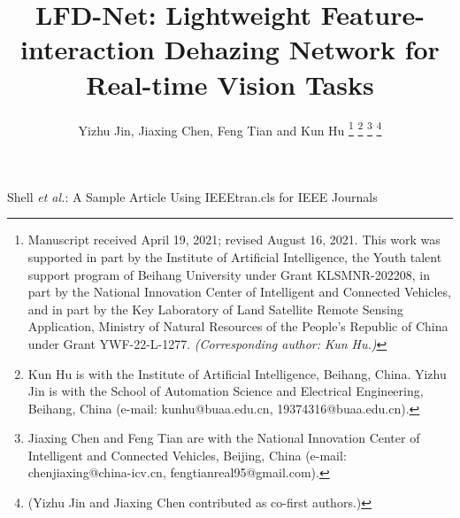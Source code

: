 \documentclass[lettersize,journal]{IEEEtran}
\begin{document}
\title{LFD-Net: Lightweight Feature-interaction Dehazing Network for Real-time Vision Tasks}

\author{
    Yizhu Jin, Jiaxing Chen, Feng Tian and Kun Hu  %
    \thanks{Manuscript received April 19, 2021; revised August 16, 2021. This work was supported in part by the Institute of Artificial Intelligence, the Youth talent support program of Beihang University under Grant KLSMNR-202208, in part by the National Innovation Center of Intelligent and Connected Vehicles, and in part by the Key Laboratory of Land Satellite Remote Sensing Application, Ministry of Natural Resources of the People's Republic of China under Grant YWF-22-L-1277. \textit{(Corresponding author: Kun Hu.)}}
    \thanks{Kun Hu is with the Institute of Artificial Intelligence, Beihang, China. Yizhu Jin is with the School of Automation Science and Electrical Engineering, Beihang, China (e-mail: kunhu@buaa.edu.cn, 19374316@buaa.edu.cn).}
    \thanks{Jiaxing Chen and Feng Tian are with the National Innovation Center of Intelligent and Connected Vehicles, Beijing, China (e-mail: chenjiaxing@china-icv.cn, fengtianreal95@gmail.com).}
    \thanks{(Yizhu Jin and Jiaxing Chen contributed as co-first authors.)}
}

%
{Shell \MakeLowercase{\textit{et al.}}: A Sample Article Using IEEEtran.cls for IEEE Journals}


\maketitle
\end{document}

